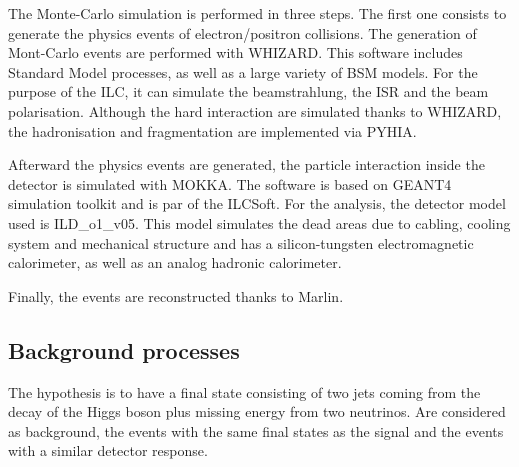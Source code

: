     The Monte-Carlo simulation is performed in three steps.
    The first one consists to generate the physics events of electron/positron collisions.
    The generation of Mont-Carlo events are performed with WHIZARD.
    This software includes Standard Model processes, as well as a large variety of BSM models.
    For the purpose of the \gls{ILC}, it can simulate the beamstrahlung, the \gls{ISR} and the beam polarisation.
    Although the hard interaction are simulated thanks to WHIZARD, the hadronisation and fragmentation are implemented via PYHIA.
    
    Afterward the physics events are generated, the particle interaction inside the detector is simulated with MOKKA.
    The software is based on GEANT4 simulation toolkit and is par of the ILCSoft.
    For the analysis, the detector model used is ILD\_o1\_v05.
    This model simulates the dead areas due to cabling, cooling system and mechanical structure and has a silicon-tungsten electromagnetic calorimeter, as well as an analog hadronic calorimeter.
    
    Finally, the events are reconstructed thanks to Marlin.

  \subsection{Background processes}

    The hypothesis is to have a final state consisting of two jets coming from the decay of the Higgs boson plus missing energy from two neutrinos.
    Are considered as background, the events with the same final states as the signal and the events with a similar detector response.

